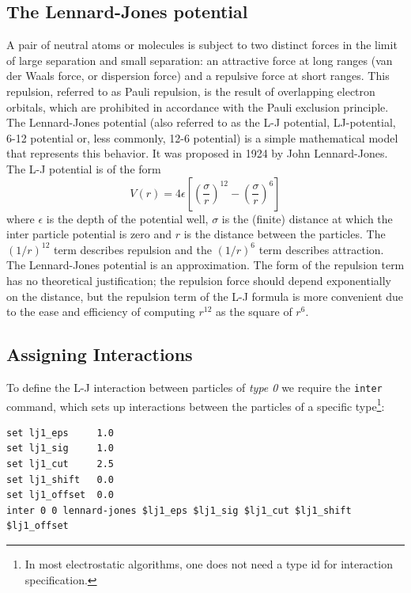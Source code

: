 \documentclass[
paper=a4,                       %
fontsize=11pt,                  %
twoside,                        %
footsepline,                    %
headsepline,                    %
headinclude=false,              %
footinclude=false,              %
pagesize,                       %
]{scrartcl}
\begin{document}
\subsection{The Lennard-Jones potential}

A pair of neutral atoms or molecules is subject to two distinct forces in the limit of large separation and small separation: an attractive force at long ranges (van der Waals force, or dispersion force) and a repulsive force at short ranges. This repulsion, referred to as Pauli repulsion, is the result of overlapping electron orbitals, which are prohibited in accordance with the Pauli exclusion principle. The Lennard-Jones potential (also referred to as the L-J potential, LJ-potential, 6-12 potential or, less commonly, 12-6 potential) is a simple mathematical model that represents this behavior. It was proposed in 1924 by John Lennard-Jones. The L-J potential is of the form
\begin{equation}
\label{eq:lj}
V(r) = 4\epsilon \left[{\left({\frac{\sigma}{r}}\right)}^{12} - \left(\frac{\sigma}{r}\right)^{6}\right]
\end{equation}
where $\epsilon$ is the depth of the potential well, $\sigma$ is the (finite) distance at which the inter particle potential is zero and $r$ is the distance between the particles. The $(1/r)^{12}$ term describes repulsion and the $(1/r)^{6}$ term describes attraction. The Lennard-Jones potential is an approximation. The form of the repulsion term has no theoretical justification; the repulsion force should depend exponentially on the distance, but the repulsion term of the L-J formula is more convenient due to the ease and efficiency of computing $r^{12}$ as the square of $r^6$.

\subsection{Assigning Interactions}  
To define the L-J interaction between particles of \emph{type 0} we require the \lstinline|inter| command, which sets up interactions between the particles of a specific type\footnote{In most electrostatic algorithms, one does not need a type id for interaction specification.}:

{\small\vspace{0,2cm}
\begin{lstlisting}[numbers=none]
set lj1_eps     1.0
set lj1_sig     1.0
set lj1_cut     2.5
set lj1_shift   0.0
set lj1_offset  0.0
inter 0 0 lennard-jones $lj1_eps $lj1_sig $lj1_cut $lj1_shift $lj1_offset
\end{lstlisting}
}\vspace{0,2cm}
\end{document}
